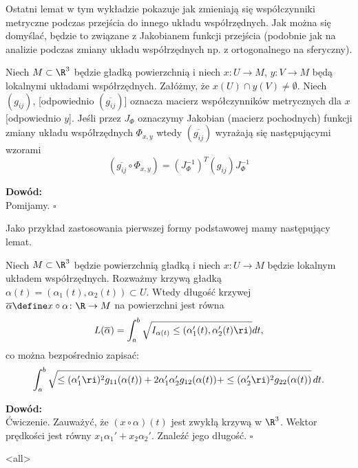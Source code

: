Ostatni lemat w tym wykładzie pokazuje jak zmieniają się współczynniki metryczne podczas przejścia do innego układu współrzędnych. Jak można się domyślać, będzie to związane z Jakobianem funkcji przejścia (podobnie jak na analizie podczas zmiany układu współrzędnych np. z ortogonalnego na sferyczny).

\begin{frame}

\begin{lemat}
Niech $M\subset \R^3$ będzie gładką powierzchnią i niech $x\colon U\to M$, $y\colon V\to M$ będą lokalnymi układami współrzędnych. Załóżmy, że $x(U)\cap y(V)\neq \emptyset$. \pause Niech $(g_{ij})$, [odpowiednio $(\overline{g_{ij}})$] oznacza macierz współczynników metrycznych dla $x$ [odpowiednio $y$]. \pause Jeśli przez $J_\Phi$ oznaczymy Jakobian (macierz pochodnych) funkcji zmiany układu współrzędnych $\Phi_{x,y}$ wtedy $(\overline{g_{ij}})$ wyrażają się następującymi wzorami\pause 
\[(\overline{g_{ij}}\circ \Phi_{x,y})=(J_\Phi^{-1})^T (g_{ij})J_\Phi^{-1}\]
\end{lemat}
\pause \textcolor{ared}{\textbf{Dowód:}}\\
Pomijamy.
\hfill $\square$
\end{frame}
\begin{frame}
Jako przykład zastosowania pierwszej formy podstawowej mamy następujący lemat.
\pause \begin{lemat}
Niech $M\subset \R^3$ będzie powierzchnią gładką i niech $x\colon U\to M$ będzie lokalnym układem współrzędnych. Rozważmy krzywą gładką $\alpha(t)=(\alpha_1(t),\alpha_2(t))\subset U$.
\pause Wtedy długość krzywej $\overline{\alpha}\define x\circ\alpha\colon \R\to M$ na powierzchni jest równa
\[L(\overline{\alpha})=\int_a^b\sqrt{I_{\alpha(t)}\le(\alpha_1 '(t),\alpha_2 '(t)\ri)}dt,\]
\pause co można bezpośrednio zapisać:
\[\int_a^b\sqrt{\le(\alpha_1'\ri)^2 g_{11}(\alpha(t))+ 2 \alpha_1'\alpha_2'g_{12}(\alpha(t))+\le(\alpha_2'\ri)^2 g_{22}(\alpha(t))}\,dt.\]
\end{lemat}

\pause \textcolor{ared}{\textbf{Dowód:}}\\
Ćwiczenie. \footnotesize {Zauważyć, że $(x\circ \alpha )(t)$ jest zwykłą krzywą w $\R^3$. Wektor prędkości jest r\'owny $x_1\alpha_1' +x_2\alpha_2'$. Znaleźć jego długość.}\normalsize
\hfill $\square$


\end{frame}

\mode<all> 
